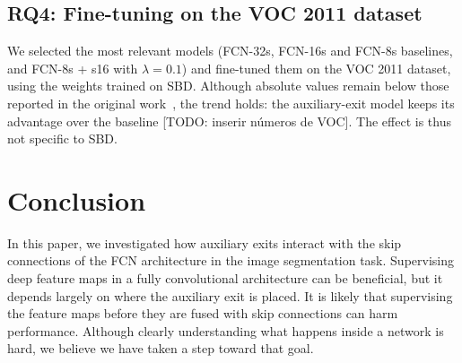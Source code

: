 \documentclass{article}
\begin{document}
    \subsection{RQ4: Fine-tuning on the VOC 2011 dataset}
    We selected the most relevant models (FCN-32s, FCN-16s and FCN-8s baselines,
    and FCN-8s + s16 with $\lambda=0.1$) and fine-tuned them on the VOC 2011 dataset, using the weights trained on SBD. Although absolute values remain below those reported in the original work~\cite{ref_fcn}, the trend holds: the auxiliary-exit model keeps its advantage over the baseline [TODO: inserir números de VOC]. The effect is thus not specific to SBD.



\section{Conclusion}
In this paper, we investigated how auxiliary exits interact with the skip connections of the FCN architecture in the image segmentation task.
Supervising deep feature maps in a fully convolutional architecture can be beneficial, but it depends largely on where the auxiliary exit is placed. It is likely that supervising the feature maps before they are fused with skip connections can harm performance.
Although clearly understanding what happens inside a network is hard, we believe we have taken a step toward that goal.
\end{document}
